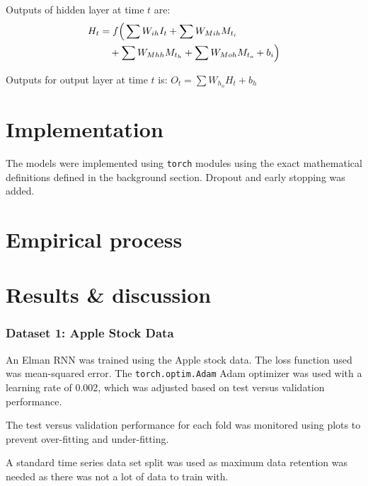 \documentclass[conference]{IEEEtran}
\begin{document}
Outputs of hidden layer at time $t$ are:
\begin{align*}
	H_{t} &= f\Big( \sum W_{ih} I_{t} + \sum W_{Mi h} M_{t_i} \notag \\
	&\quad + \sum W_{Mh h} M_{t_h} + \sum W_{Mo h} M_{t_o} + b_{i} \Big)
\end{align*}

Outputs for output layer at time $t$ is: $O_{t} = \sum W_{h_o} H_{t} + b_{h}$








\section{Implementation}

The models were implemented using \texttt{torch} modules using the exact mathematical definitions defined in the background section. Dropout and early stopping was added.



\section{Empirical process}

\section{Results \& discussion}

\subsubsection{Dataset 1: Apple Stock Data}

An Elman RNN was trained using the Apple stock data. The loss function used was mean-squared error. The \texttt{torch.optim.Adam} Adam optimizer was used with a learning rate of 0.002, which was adjusted based on test versus validation performance.

The test versus validation performance for each fold was monitored using plots to prevent over-fitting and under-fitting.

A standard time series data set split was used as maximum data retention was needed as there was not a lot of data to train with.
\end{document}
